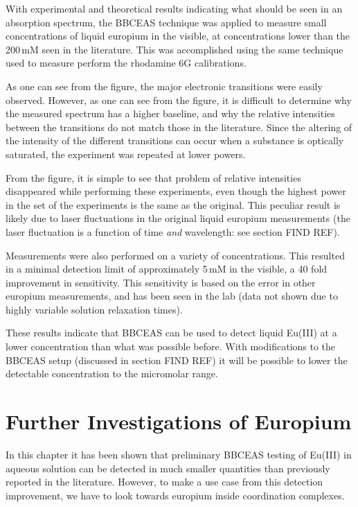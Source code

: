 With experimental and theoretical results indicating what should be seen in an
absorption spectrum, the \ac{BBCEAS} technique was applied to measure small
concentrations of liquid europium in the visible, at concentrations lower than
the 200\,mM seen in the literature. This was accomplished using the same
technique used to measure perform the rhodamine 6G calibrations.

As one can see from the figure, the major electronic transitions were
easily observed. However, as one can see from the figure, it is difficult
to determine why the measured spectrum has a higher baseline, and why the
relative intensities between the transitions do not match those in the
literature. Since the altering of the intensity of the different transitions
can occur when a substance is optically saturated, the experiment was repeated
at lower powers.

From the figure, it is simple to see that problem of relative intensities
disappeared while performing these experiments, even though the highest power
in the set of the experiments is the same as the original. This peculiar
result is likely due to laser fluctuations in the original liquid europium
measurements (the laser fluctuation is a function of time \emph{and} wavelength: see section FIND REF).

Measurements were also performed on a variety of concentrations. This resulted
in a minimal detection limit of approximately 5\,mM in the visible, a 40 fold
improvement in sensitivity. This sensitivity is based on the error in other
europium measurements, and has been seen in the lab (data not shown due to
highly variable solution relaxation times).

These results indicate that \ac{BBCEAS} can be used to detect liquid Eu(III)
at a lower concentration than what was possible before. With modifications to
the \ac{BBCEAS} setup (discussed in section FIND REF) it will be possible to
lower the detectable concentration to the micromolar range.

\section{Further Investigations of Europium}

In this chapter it has been shown that preliminary \ac{BBCEAS} testing of Eu(III) in aqueous solution can be detected in much smaller quantities than previously reported in the literature. However, to make a use case from this detection improvement, we have to look towards europium inside coordination complexes.

